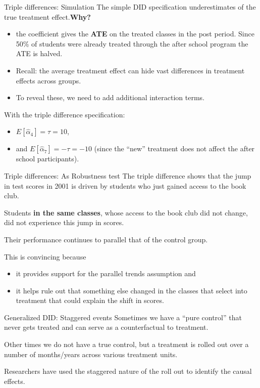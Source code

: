 \documentclass[
  ignorenonframetext,
]{beamer}
\begin{document}
\begin{frame}{Triple differences: Simulation}
\protect\hypertarget{triple-differences-simulation-4}{}
The simple DID specification underestimates of the true treatment
effect.\textbf{Why?}

\begin{itemize}
\item
  the coefficient gives the \textbf{ATE} on the treated classes in the
  post period. Since 50\% of students were already treated through the
  after school program the ATE is halved.
\item
  Recall: the average treatment effect can hide vast differences in
  treatment effects across groups.
\item
  To reveal these, we need to add additional interaction terms.
\end{itemize}

With the triple difference specification:

\begin{itemize}
\item
  \(E[\hat{\alpha}_4]=\tau=10\),
\item
  and \(E[\hat{\alpha}_7]=-\tau=-10\) (since the ``new'' treatment does
  not affect the after school participants).
\end{itemize}
\end{frame}

\begin{frame}{Triple differences: As Robustness test}
\protect\hypertarget{triple-differences-as-robustness-test}{}
The triple difference shows that the jump in test scores in 2001 is
driven by students who just gained access to the book club.

Students \textbf{in the same classes}, whose access to the book club did
not change, did not experience this jump in scores.

Their performance continues to parallel that of the control group.

This is convincing because

\begin{itemize}
\item
  it provides support for the parallel trends assumption and
\item
  it helps rule out that something else changed in the classes that
  select into treatment that could explain the shift in scores.
\end{itemize}
\end{frame}

\begin{frame}{Generalized DID: Staggered events}
\protect\hypertarget{generalized-did-staggered-events}{}
Sometimes we have a ``pure control'' that never gets treated and can
serve as a counterfactual to treatment.

Other times we do not have a true control, but a treatment is rolled out
over a number of months/years across various treatment units.

Researchers have used the staggered nature of the roll out to identify
the causal effects.
\end{frame}
\end{document}
